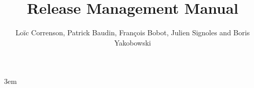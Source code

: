 \documentclass{frama-c-book}
\title{Release Management Manual}
\author{Loïc Correnson, Patrick Baudin, François Bobot, Julien Signoles and Boris Yakobowski}
\begin{document}
\sloppy
\emergencystretch 3em

\maketitle
\tableofcontents






\end{document}
